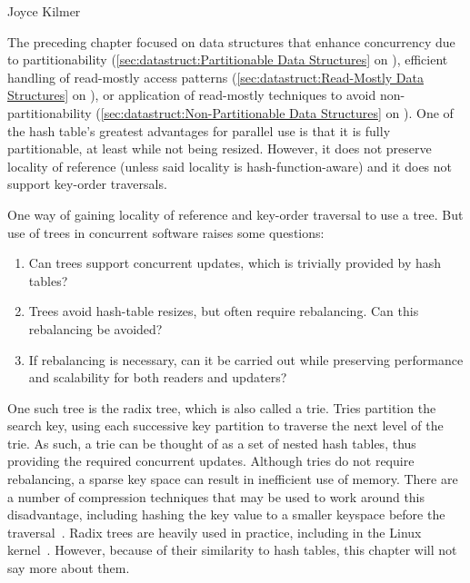 
%
	 {Joyce Kilmer}

The preceding chapter focused on data structures that enhance
concurrency due to partitionability
(\cref{sec:datastruct:Partitionable Data Structures}
on
),
efficient handling of read-mostly access patterns
(\cref{sec:datastruct:Read-Mostly Data Structures}
on
),
or application of read-mostly techniques to avoid
non-partitionability
(\cref{sec:datastruct:Non-Partitionable Data Structures}
on
).
One of the hash table's greatest advantages for parallel use is that it
is fully partitionable, at least while not being resized.
However, it does not preserve locality of reference (unless said
locality is hash-function-aware) and it does not support key-order
traversals.

One way of gaining locality of reference and key-order traversal
to use a tree.
But use of trees in concurrent software raises some questions:

\begin{enumerate}
\item	Can trees support concurrent updates, which is trivially
	provided by hash tables?
\item	Trees avoid hash-table resizes, but often require
	rebalancing.
	Can this rebalancing be avoided?
\item	If rebalancing is necessary, can it be carried out while
	preserving performance and scalability for both readers
	and updaters?
\end{enumerate}

One such tree is the radix tree, which is also called a trie.
Tries partition the search key, using each successive key partition
to traverse the next level of the trie.
As such, a trie can be thought of as a set of nested hash tables,
thus providing the required concurrent updates.
Although tries do not require rebalancing, a sparse key space can result
in inefficient use of memory.
There are a number of compression techniques that may be used to
work around this disadvantage, including hashing the key value to
a smaller keyspace before the
traversal~\cite{RobertOlsson2007Trash}.
Radix trees are heavily used in practice, including in the Linux
kernel~\cite{NickPiggin2006radixtree}.
However, because of their similarity to hash tables, this chapter
will not say more about them.

